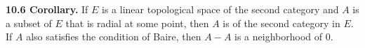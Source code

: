 \textbf{10.6 Corollary.} If $E$ is a linear topological space of the second category and $A$ is a subset of $E$ that is radial at some point, then $A$ is of the second category in $E$. If $A$ also satisfies the condition of Baire, then $A - A$ is a neighborhood of $0$.
